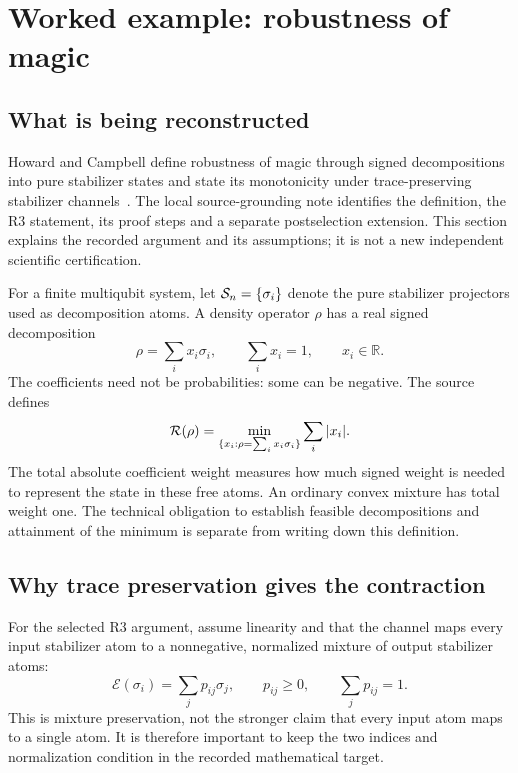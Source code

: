 \section{Worked example: robustness of magic}\label{sec:robustness}

\subsection{What is being reconstructed}

Howard and Campbell define robustness of magic through signed decompositions into pure stabilizer states and state its monotonicity under trace-preserving stabilizer channels~\cite{howard2016magic}. The local source-grounding note identifies the definition, the R3 statement, its proof steps and a separate postselection extension. This section explains the recorded argument and its assumptions; it is not a new independent scientific certification.

For a finite multiqubit system, let $\mathcal{S}_n=\{\sigma_i\}$ denote the pure stabilizer projectors used as decomposition atoms. A density operator $\rho$ has a real signed decomposition
\begin{equation}
  \rho=\sum_i x_i\sigma_i,
  \qquad \sum_i x_i=1,
  \qquad x_i\in\mathbb{R}.
\end{equation}
The coefficients need not be probabilities: some can be negative. The source defines
\begin{equation}
  \mathcal{R}(\rho)=\min_{\{x_i:\rho=\sum_i x_i\sigma_i\}}\sum_i|x_i|.
  \label{eq:robustness}
\end{equation}
The total absolute coefficient weight measures how much signed weight is needed to represent the state in these free atoms. An ordinary convex mixture has total weight one. The technical obligation to establish feasible decompositions and attainment of the minimum is separate from writing down this definition.

\subsection{Why trace preservation gives the contraction}

For the selected R3 argument, assume linearity and that the channel maps every input stabilizer atom to a nonnegative, normalized mixture of output stabilizer atoms:
\begin{equation}
  \mathcal{E}(\sigma_i)=\sum_j p_{ij}\sigma_j,
  \qquad p_{ij}\geq0,
  \qquad\sum_jp_{ij}=1.
  \label{eq:channel}
\end{equation}
This is mixture preservation, not the stronger claim that every input atom maps to a single atom. It is therefore important to keep the two indices and normalization condition in the recorded mathematical target.

